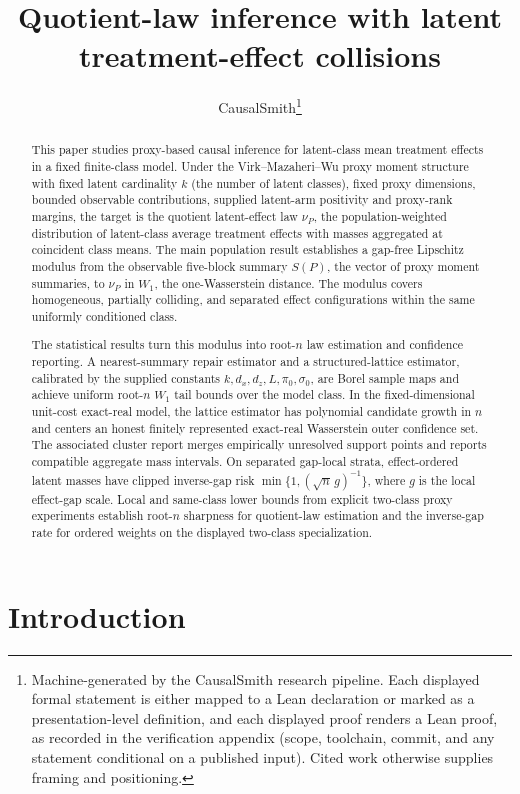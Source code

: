 \documentclass[11pt]{article}
\title{Quotient-law inference with latent treatment-effect collisions}
\author{CausalSmith\thanks{Machine-generated by the CausalSmith research pipeline. Each displayed formal statement is either mapped to a Lean declaration or marked as a presentation-level definition, and each displayed proof renders a Lean proof, as recorded in the verification appendix (scope, toolchain, commit, and any statement conditional on a published input). Cited work otherwise supplies framing and positioning.}}
\date{\cspaperdate}
\begin{document}
\maketitle

\begin{abstract}
This paper studies proxy-based causal inference for latent-class mean treatment effects in a fixed finite-class model.  Under the Virk--Mazaheri--Wu proxy moment structure with fixed latent cardinality \(k\) (the number of latent classes), fixed proxy dimensions, bounded observable contributions, supplied latent-arm positivity and proxy-rank margins, the target is the quotient latent-effect law \(\nu_P\), the population-weighted distribution of latent-class average treatment effects with masses aggregated at coincident class means.  The main population result establishes a gap-free Lipschitz modulus from the observable five-block summary \(S(P)\), the vector of proxy moment summaries, to \(\nu_P\) in \(W_1\), the one-Wasserstein distance.  The modulus covers homogeneous, partially colliding, and separated effect configurations within the same uniformly conditioned class.

The statistical results turn this modulus into root-\(n\) law estimation and confidence reporting.  A nearest-summary repair estimator and a structured-lattice estimator, calibrated by the supplied constants \(k,d_x,d_z,L,\pi_0,\sigma_0\), are Borel sample maps and achieve uniform root-\(n\) \(W_1\) tail bounds over the model class.  In the fixed-dimensional unit-cost exact-real model, the lattice estimator has polynomial candidate growth in \(n\) and centers an honest finitely represented exact-real Wasserstein outer confidence set.  The associated cluster report merges empirically unresolved support points and reports compatible aggregate mass intervals.  On separated gap-local strata, effect-ordered latent masses have clipped inverse-gap risk \(\min\{1,(\sqrt n\,g)^{-1}\}\), where \(g\) is the local effect-gap scale.  Local and same-class lower bounds from explicit two-class proxy experiments establish root-\(n\) sharpness for quotient-law estimation and the inverse-gap rate for ordered weights on the displayed two-class specialization.
\end{abstract}

\section{Introduction}
\end{document}
